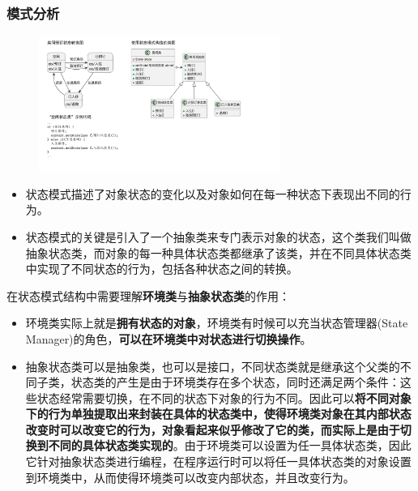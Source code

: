 \subsubsection{模式分析}
\begin{figure}[H]
    \vspace{-0.5em}
	\centering
	\includegraphics[width=0.7\textwidth]{images/状态模式分析.pdf}
    \vspace{-1em}
\end{figure}

\begin{itemize}
    \item 状态模式描述了对象状态的变化以及对象如何在每一种状态下表现出不同的行为。
    \item 状态模式的关键是引入了一个抽象类来专门表示对象的状态，这个类我们叫做抽象状态类，而对象的每一种具体状态类都继承了该类，并在不同具体状态类中实现了不同状态的行为，包括各种状态之间的转换。
\end{itemize}

在状态模式结构中需要理解\textbf{环境类}与\textbf{抽象状态类}的作用：
\begin{itemize}
    \item 环境类实际上就是\textbf{拥有状态的对象}，环境类有时候可以充当状态管理器(State Manager)的角色，\textbf{可以在环境类中对状态进行切换操作}。
    \item 抽象状态类可以是抽象类，也可以是接口，不同状态类就是继承这个父类的不同子类，状态类的产生是由于环境类存在多个状态，同时还满足两个条件：这些状态经常需要切换，在不同的状态下对象的行为不同。因此可以\textbf{将不同对象下的行为单独提取出来封装在具体的状态类中，使得环境类对象在其内部状态改变时可以改变它的行为，对象看起来似乎修改了它的类，而实际上是由于切换到不同的具体状态类实现的}。由于环境类可以设置为任一具体状态类，因此它针对抽象状态类进行编程，在程序运行时可以将任一具体状态类的对象设置到环境类中，从而使得环境类可以改变内部状态，并且改变行为。
\end{itemize}

